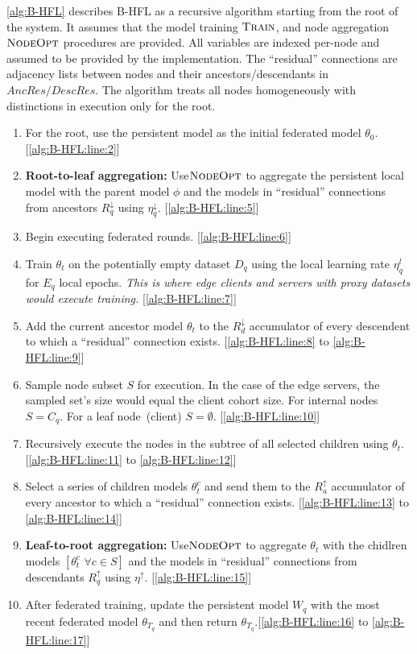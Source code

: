 \cref{alg:B-HFL} describes B-HFL as a recursive algorithm starting from the root of the system. It assumes that the model training $\textsc{Train}$, and node aggregation $\textsc{NodeOpt}$ procedures are provided. All variables are indexed per-node and assumed to be provided by the implementation. The ``residual'' connections are adjacency lists between nodes and their ancestors/descendants in $AncRes/DescRes$. The algorithm treats all nodes homogeneously with distinctions in execution only for the root.
\begin{enumerate}
    \item For the root, use the persistent model as the initial federated model $\theta_0$.  [\cref{alg:B-HFL:line:2}]

    \item \textbf{Root-to-leaf aggregation:} Use$\textsc{NodeOpt}$ to aggregate the persistent local model with the parent model $\phi$ and the models in ``residual'' connections from ancestors $R^\downarrow_q$ using $\eta^\downarrow_q$. [\cref{alg:B-HFL:line:5}]
    \item Begin executing federated rounds. [\cref{alg:B-HFL:line:6}]
    \item Train $\theta_t$ on the potentially empty dataset $D_q$ using the local learning rate $\eta^l_q$ for $E_q$ local epochs. \textit{This is where edge clients and servers with proxy datasets would execute training.} [\cref{alg:B-HFL:line:7}]
    \item Add the current ancestor model $\theta_t$ to the $R^\downarrow_d$ accumulator of every descendent to which a ``residual'' connection exists. [\cref{alg:B-HFL:line:8} to \cref{alg:B-HFL:line:9}]
    \item Sample node subset $S$ for execution. In the case of the edge servers, the sampled set's size would equal the client cohort size. For internal nodes $S = C_q$. For a leaf node~(client) $S = \emptyset$. [\cref{alg:B-HFL:line:10}]
    \item Recursively execute the nodes in the subtree of all selected children using $\theta_t$.  [\cref{alg:B-HFL:line:11} to \cref{alg:B-HFL:line:12}]
    \item Select a series of children models $\theta_t^c$ and send them to the $R^\uparrow_a$ accumulator of every ancestor to which a ``residual'' connection exists. [\cref{alg:B-HFL:line:13} to \cref{alg:B-HFL:line:14}]
    \item \textbf{Leaf-to-root aggregation:} Use$\textsc{NodeOpt}$ to aggregate $\theta_t$ with the chidlren models $[\theta^c_t \,\, \forall c \in S]$ and the models in ``residual'' connections from descendants $R^\uparrow_q$ using $\eta^\uparrow$.  [\cref{alg:B-HFL:line:15}]
    \item After federated training, update the persistent model $W_q$ with the most recent federated model $\theta_{T_q}$ and then return $\theta_{T_q}$.[\cref{alg:B-HFL:line:16} to \cref{alg:B-HFL:line:17}]


\end{enumerate}

